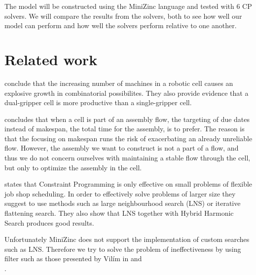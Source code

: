 The model will be constructed using the MiniZinc language and tested with 6 CP solvers. We will compare the results from the solvers, both to see how well our model can perform and how well the solvers perform relative to one another.

\section{Related work}
\cite{sethi_2006} conclude that the increasing number of machines in a robotic cell causes an explosive growth in combinatorial possibilites. They also provide evidence that a dual-gripper cell is more productive than a single-gripper cell.

\cite{thornblad_2013} concludes that when a cell is part of an assembly flow, the targeting of due dates instead of makespan, the total time for the assembly, is to prefer. The reason is that the focusing on makespan runs the risk of exacerbating an already unreliable flow. However, the assembly we want to construct is not a part of a flow, and thus we do not concern ourselves with maintaining a stable flow through the cell, but only to optimize the assembly in the cell.

\cite{yuan_2013} states that Constraint Programming is only effective on small problems of flexible job shop scheduling. In order to effectively solve problems of larger size they suggest to use methods such as large neighbourhood search (LNS) or iterative flattening search. They also show that LNS together with Hybrid Harmonic Search produces good results.

Unfortunately MiniZinc does not support the implementation of custom searches such as LNS. Therefore we try to solve the problem of ineffectiveness by using filter such as those presented by Vilím in \cite{VilimBartak2002Batch} \cite{Vilim2002Precedence} and \\\cite{VilimBartak2002Sequence}.

